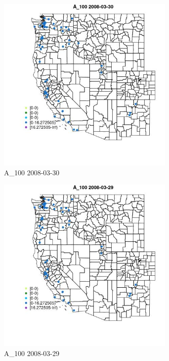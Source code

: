 \begin{figure} 
\centering  
\includegraphics[width=0.77\textwidth]{Code_Outputs/Report_ML_input_PM25_Step4_part_e_de_duplicated_aves_MapObsA_1002008-03-30.jpg} 
\caption{\label{fig:Report_ML_input_PM25_Step4_part_e_de_duplicated_avesMapObsA_1002008-03-30}A_100 2008-03-30} 
\end{figure} 
 

\begin{figure} 
\centering  
\includegraphics[width=0.77\textwidth]{Code_Outputs/Report_ML_input_PM25_Step4_part_e_de_duplicated_aves_MapObsA_1002008-03-29.jpg} 
\caption{\label{fig:Report_ML_input_PM25_Step4_part_e_de_duplicated_avesMapObsA_1002008-03-29}A_100 2008-03-29} 
\end{figure} 
 

